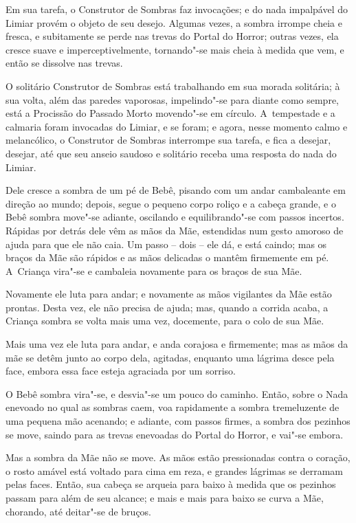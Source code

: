 Em sua tarefa, o Construtor de Sombras faz invocações; e do nada
impalpável do Limiar provém o objeto de seu desejo. Algumas vezes, a
sombra irrompe cheia e fresca, e subitamente se perde nas trevas do
Portal do Horror; outras vezes, ela cresce suave e imperceptivelmente,
tornando"-se mais cheia à medida que vem, e então se dissolve nas trevas.

\smallskip
O solitário Construtor de Sombras está trabalhando em sua morada
solitária; à sua volta, além das paredes vaporosas, impelindo"-se para
diante como sempre, está a Procissão do Passado Morto movendo"-se em
círculo. A~tempestade e a calmaria foram invocadas do Limiar, e se
foram; e agora, nesse momento calmo e melancólico, o Construtor de
Sombras interrompe sua tarefa, e fica a desejar, desejar, até que seu
anseio saudoso e solitário receba uma resposta do nada do Limiar.

Dele cresce a sombra de um pé de Bebê, pisando com um andar cambaleante
em direção ao mundo; depois, segue o pequeno corpo roliço e a cabeça
grande, e o Bebê sombra move"-se adiante, oscilando e equilibrando"-se com
passos incertos. Rápidas por detrás dele vêm as mãos da Mãe, estendidas
num gesto amoroso de ajuda para que ele não caia. Um passo -- dois --
ele dá, e está caindo; mas os braços da Mãe são rápidos e as mãos
delicadas o mantêm firmemente em pé. A~Criança vira"-se e cambaleia
novamente para os braços de sua Mãe.

Novamente ele luta para andar; e novamente as mãos vigilantes da Mãe
estão prontas. Desta vez, ele não precisa de ajuda; mas, quando a
corrida acaba, a Criança sombra se volta mais uma vez, docemente, para o
colo de sua Mãe.

Mais uma vez ele luta para andar, e anda corajosa e firmemente; mas as
mãos da mãe se detêm junto ao corpo dela, agitadas, enquanto uma lágrima
desce pela face, embora essa face esteja agraciada por um sorriso.

O Bebê sombra vira"-se, e desvia"-se um pouco do caminho. Então, sobre o
Nada enevoado no qual as sombras caem, voa rapidamente a sombra
tremeluzente de uma pequena mão acenando; e adiante, com passos firmes,
a sombra dos pezinhos se move, saindo para as trevas enevoadas do Portal
do Horror, e vai"-se embora.

Mas a sombra da Mãe não se move. As mãos estão pressionadas contra o
coração, o rosto amável está voltado para cima em reza, e grandes
lágrimas se derramam pelas faces. Então, sua cabeça se arqueia para
baixo à medida que os pezinhos passam para além de seu alcance; e mais e
mais para baixo se curva a Mãe, chorando, até deitar"-se de bruços.

